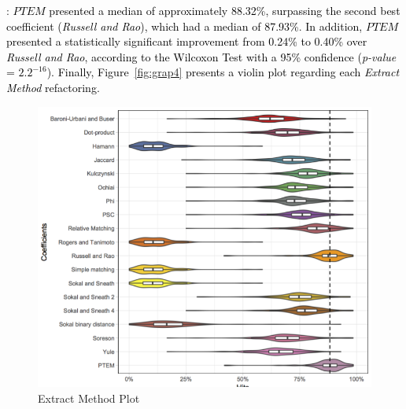 \documentclass[smallextended,natbib]{svjour3}
\begin{document}
{: \textcolor{black}{$PTEM$ presented a median of approximately 88.32\%, surpassing the second best coefficient (\textit{Russell and Rao}), which had a median of 87.93\%}. %
\textcolor{black}{In addition, $PTEM$ presented a statistically significant improvement from 0.24\% to 0.40\% over \textit{Russell and Rao}, according to the Wilcoxon Test with a 95\% confidence (\textit{p-value} = ${2.2}^{-16}$).} 
\textcolor{black}{Finally, Figure~\ref{fig:grap4} presents a violin plot regarding each \textit{Extract Method} refactoring.} \\

\begin{figure}[ht]
\centering
\includegraphics[scale=0.35]{EM.png}
\vspace{-5pt}
\caption{Extract Method Plot}
\label{fig:graph4}
\end{figure}

}
\end{document}
